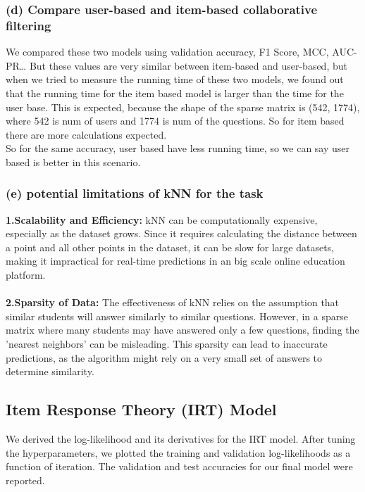 \documentclass{article}
\begin{document}
\subsubsection*{(d) Compare user-based and item-based collaborative filtering}
We compared these two models using validation accuracy, F1 Score, MCC, AUC-PR…
But these values are very similar between item-based and user-based, but when we tried to measure the running time of these two models, we found out that the running time for the item based model is larger than the time for the user base. This is expected, because the shape of the sparse matrix is (542, 1774), where 542 is num of users and 1774 is num of the questions. So for item based there are more calculations expected. \\
So for the same accuracy, user based have less running time, so we can say user based is better in this scenario.

\subsubsection*{(e) potential limitations of kNN for the task}
\textbf{1.Scalability and Efficiency:} kNN can be computationally expensive, especially as the dataset grows. Since it requires calculating the distance between a point and all other points in the dataset, it can be slow for large datasets, making it impractical for real-time predictions in an big scale online education platform.\\
\\
\textbf{2.Sparsity of Data:} The effectiveness of kNN relies on the assumption that similar students will answer similarly to similar questions. However, in a sparse matrix where many students may have answered only a few questions, finding the 'nearest neighbors' can be misleading. This sparsity can lead to inaccurate predictions, as the algorithm might rely on a very small set of answers to determine similarity.



\subsection*{Item Response Theory (IRT) Model}
We derived the log-likelihood and its derivatives for the IRT model. After tuning the hyperparameters, we plotted the training and validation log-likelihoods as a function of iteration. The validation and test accuracies for our final model were reported.
\end{document}
